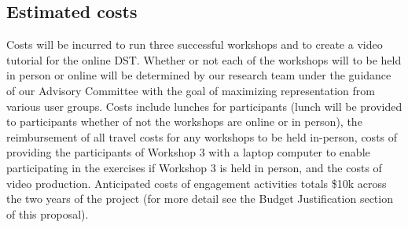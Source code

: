\documentclass[12pt]{elsarticle}
\begin{document}
\subsection*{Estimated costs}

Costs will be incurred to run three successful workshops and to create a video tutorial for the online DST. Whether or not each of the workshops will to be held in person or online will be determined by our research team under the guidance of our Advisory Committee with the goal of maximizing representation from various user groups. Costs include lunches for participants (lunch will be provided to participants whether of not the workshops are online or in person), the reimbursement of all travel costs for any workshops to be held in-person, costs of providing the participants of Workshop 3 with a laptop computer to enable participating in the exercises if Workshop 3 is held in person, and the costs of video production. Anticipated costs of engagement activities totals \$10k across the two years of the project (for more detail see the Budget Justification section of this proposal).

\clearpage
\normalsize

\end{document}
